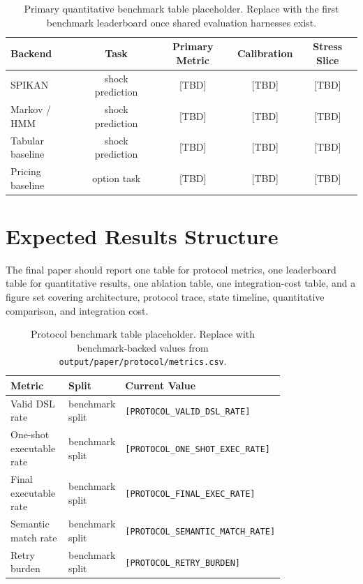 \documentclass[11pt]{article}
\begin{document}
\begin{table}[H]
  \centering
  \caption{Primary quantitative benchmark table placeholder. Replace with the
  first benchmark leaderboard once shared evaluation harnesses exist.}
  \label{tab:quant-benchmark}
  \begin{tabular}{lcccc}
    \toprule
    Backend & Task & Primary Metric & Calibration & Stress Slice \\
    \midrule
    SPIKAN & shock prediction & [TBD] & [TBD] & [TBD] \\
    Markov / HMM & shock prediction & [TBD] & [TBD] & [TBD] \\
    Tabular baseline & shock prediction & [TBD] & [TBD] & [TBD] \\
    Pricing baseline & option task & [TBD] & [TBD] & [TBD] \\
    \bottomrule
  \end{tabular}
\end{table}

\section{Expected Results Structure}

The final paper should report one table for protocol metrics, one leaderboard
table for quantitative results, one ablation table, one integration-cost table,
and a figure set covering architecture, protocol trace, state timeline,
quantitative comparison, and integration cost.

\begin{table}[H]
  \centering
  \caption{Protocol benchmark table placeholder. Replace with benchmark-backed
  values from \texttt{output/paper/protocol/metrics.csv}.}
  \label{tab:protocol}
  \begin{tabular}{p{0.34\linewidth} p{0.18\linewidth} p{0.26\linewidth}}
    \toprule
    Metric & Split & Current Value \\
    \midrule
    Valid DSL rate & benchmark split & \texttt{[PROTOCOL\_VALID\_DSL\_RATE]} \\
    One-shot executable rate & benchmark split & \texttt{[PROTOCOL\_ONE\_SHOT\_EXEC\_RATE]} \\
    Final executable rate & benchmark split & \texttt{[PROTOCOL\_FINAL\_EXEC\_RATE]} \\
    Semantic match rate & benchmark split & \texttt{[PROTOCOL\_SEMANTIC\_MATCH\_RATE]} \\
    Retry burden & benchmark split & \texttt{[PROTOCOL\_RETRY\_BURDEN]} \\
    \bottomrule
  \end{tabular}
\end{table}
\end{document}
